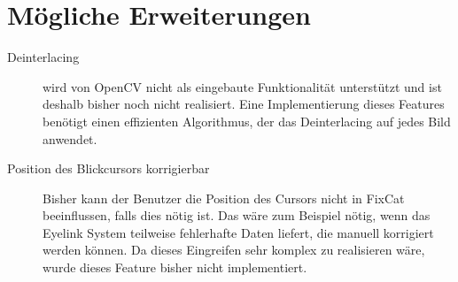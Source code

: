 \documentclass[a4paper,draft]{scrartcl}
\begin{document}
\section{M\"ogliche Erweiterungen}
  \begin{description}
    \item[Deinterlacing] wird von OpenCV nicht als eingebaute Funktionalität unterstützt und ist deshalb bisher noch nicht realisiert. Eine Implementierung dieses Features benötigt einen effizienten Algorithmus, der das Deinterlacing auf jedes Bild anwendet. 
    \item[Position des Blickcursors korrigierbar] Bisher kann der Benutzer die Position des Cursors nicht in FixCat beeinflussen, falls dies nötig ist. Das wäre zum Beispiel nötig, wenn das Eyelink System teilweise fehlerhafte Daten liefert, die manuell korrigiert werden können. Da dieses Eingreifen sehr komplex zu realisieren wäre, wurde dieses Feature bisher nicht implementiert.
  \end{description}
\end{document}
